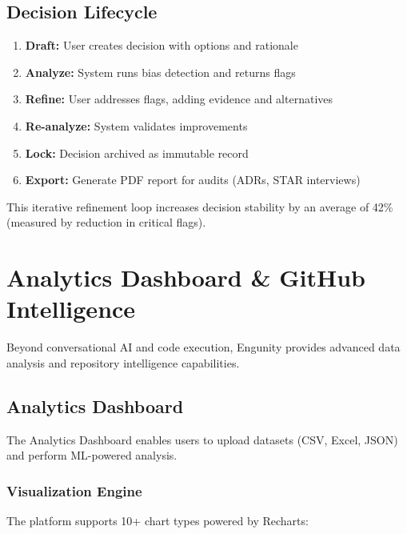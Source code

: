 \documentclass[conference]{IEEEtran}
\begin{document}
\subsection{Decision Lifecycle}

\begin{enumerate}
    \item \textbf{Draft:} User creates decision with options and rationale
    \item \textbf{Analyze:} System runs bias detection and returns flags
    \item \textbf{Refine:} User addresses flags, adding evidence and alternatives
    \item \textbf{Re-analyze:} System validates improvements
    \item \textbf{Lock:} Decision archived as immutable record
    \item \textbf{Export:} Generate PDF report for audits (ADRs, STAR interviews)
\end{enumerate}

This iterative refinement loop increases decision stability by an average of 42\% (measured by reduction in critical flags).


\section{Analytics Dashboard \& GitHub Intelligence}

Beyond conversational AI and code execution, Engunity provides advanced data analysis and repository intelligence capabilities.

\subsection{Analytics Dashboard}

The Analytics Dashboard enables users to upload datasets (CSV, Excel, JSON) and perform ML-powered analysis.

\subsubsection{Visualization Engine}

The platform supports 10+ chart types powered by Recharts:
\end{document}
